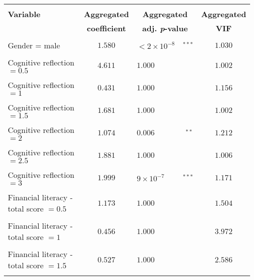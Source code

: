 \documentclass[a4paper,12pt]{article}
\begin{document}
{\begin{threeparttable}
\begin{small}
\begin{tabular}{lclrc}
\vspace{-0.2cm} \\
  \multicolumn{1}{l}{\vspace{0.1cm}\textbf{Variable}} & \multicolumn{1}{c}{\textbf{Aggregated}} &  \multicolumn{2}{c}{\textbf{Aggregated}}&  \multicolumn{1}{c}{\textbf{Aggregated}}  \\
    \multicolumn{1}{l}{ } &  \multicolumn{1}{c}{\textbf{coefficient}} &  \multicolumn{2}{c}{\textbf{adj. \textit{p}-value}} &  \multicolumn{1}{c}{\textbf{VIF}}\\
 \hline 
\hline
\\
\vspace{-0.2cm}Gender = male&$1.580$&$<2\times10^{-8}$&$^{***}$&$1.030$\\
  \\
\vspace{-0.2cm}Cognitive reflection $=0.5$&$4.611$&$1.000$&&$1.002$\\
  \\
\vspace{-0.2cm}Cognitive reflection $=1$&$0.431$&$1.000$&&$1.156$\\
\\
\vspace{-0.2cm}Cognitive reflection $=1.5$&$1.681$&$1.000$&&$1.002$\\
  \\
\vspace{-0.2cm}Cognitive reflection $=2$&$1.074$&$0.006$&$^{**}$&$1.212$\\
  \\
\vspace{-0.2cm}Cognitive reflection $=2.5$&$1.881$&$1.000$& &$1.006$\\
  \\
  \vspace{-0.2cm}Cognitive reflection $=3$&$1.999$&$9\times10^{-7}$&$^{***}$&$1.171$\\
\\
\vspace{-0.2cm}Financial literacy - total score $=0.5$&$1.173$&$1.000$& &$1.504$\\
  \\
\vspace{-0.2cm}Financial literacy - total score $=1$&$0.456$& $1.000$& &$3.972$\\
  \\
\vspace{-0.2cm}Financial literacy - total score $=1.5$&$0.527$& $1.000$&&$2.586$\\
  \\

\end{tabular}
\end{small}
\end{threeparttable}}
\end{document}
